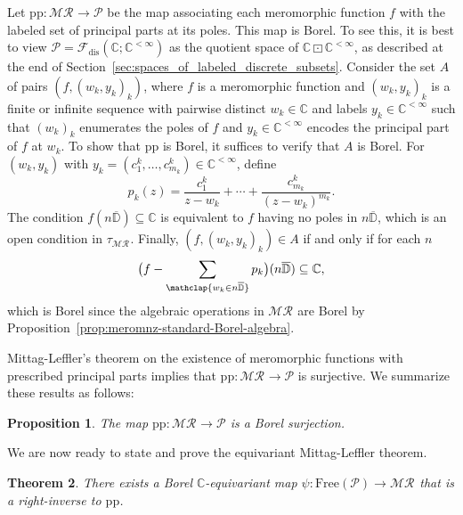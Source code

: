 \documentclass[12pt]{paper}
\numberwithin{equation}{section}
\theoremstyle{plain}
\newtheorem{theorem}{Theorem}[section]
\newtheorem{proposition}[theorem]{Proposition}
\theoremstyle{definition}
\newcommand{\C}{\mathbb{C}}
\renewcommand{\Dbar}{\overline{\mathbb{D}}}
\newcommand{\effrosdis}[1]{\mathcal{F}_{\textrm{dis}}(#1)}
\newcommand{\merom}[1][]{\mathcal{MR}_{#1}}
\newcommand{\ppart}{\mathcal{P}}
\newcommand{\ppm}{\mathrm{pp}}      %
\DeclareMathOperator{\lprod}{\boxdot}
\newcommand{\free}{\mathrm{Free}}
\begin{document}
Let \(\ppm : \merom \to \ppart\) be the map associating each meromorphic function \(f\) with the
labeled set of principal parts at its poles.  This map is Borel.  To see this, it is best to view
\(\ppart = \effrosdis{\C; \C^{<\infty}}\) as the quotient space of \(\C \lprod \C^{<\infty}\), as
described at the end of Section~\ref{sec:spaces_of_labeled_discrete_subsets}.  Consider the set
\(A\) of pairs \((f, (w_{k}, y_{k})_{k})\), where \(f\) is a meromorphic function and
\((w_{k}, y_{k})_{k} \) is a finite or infinite sequence with pairwise distinct \(w_{k} \in \C\) and
labels \(y_{k} \in \C^{<\infty}\) such that \((w_{k})_{k}\) enumerates the poles of \(f\) and
\(y_{k} \in \C^{<\infty}\) encodes the principal part of \(f\) at \(w_{k}\).  To show that \(\ppm\)
is Borel, it suffices to verify that \(A\) is Borel.  For \((w_{k},y_{k})\) with
\(y_{k} = (c^{k}_{1}, \ldots, c^{k}_{m_{k}}) \in \C^{<\infty}\), define
\[p_{k}(z) = \frac{c^{k}_{1}}{z-w_{k}} + \cdots + \frac{c^{k}_{m_{k}}}{(z-w_{k})^{m_{k}}}.\]
The condition \(f(n\Dbar) \subseteq \C\) is equivalent to \(f\) having no poles in \(n\Dbar\), which
is an open condition in \(\tau_{\merom}\).  Finally, \((f, (w_{k}, y_{k})_{k}) \in A\) if and only
if for each \(n\)
\[ \bigl(f - \sum_{\mathclap{w_{k} \in n\Dbar}} p_{k} \bigr)(n\Dbar) \subseteq \C,\]
which is Borel since the algebraic operations in \(\merom\) are Borel by
Proposition~\ref{prop:meromnz-standard-Borel-algebra}.

Mittag-Leffler's theorem on the existence of meromorphic functions with prescribed principal parts
implies that \(\ppm : \merom \to \ppart\) is surjective.  We summarize these results as follows:
\begin{proposition}
  \label{prop:dvs-and-ppm-are-Borel-surjective}
  The map \(\ppm : \merom \to \ppart\) is a Borel surjection.
\end{proposition}

We are now ready to state and prove the equivariant Mittag-Leffler theorem.
\begin{theorem}
  \label{thm:mittag-leffler}
  There exists a Borel \(\C\)-equivariant map \(\psi : \free(\ppart) \to \merom\) that is a
  right-inverse to \(\ppm\).
\end{theorem}
\end{document}
